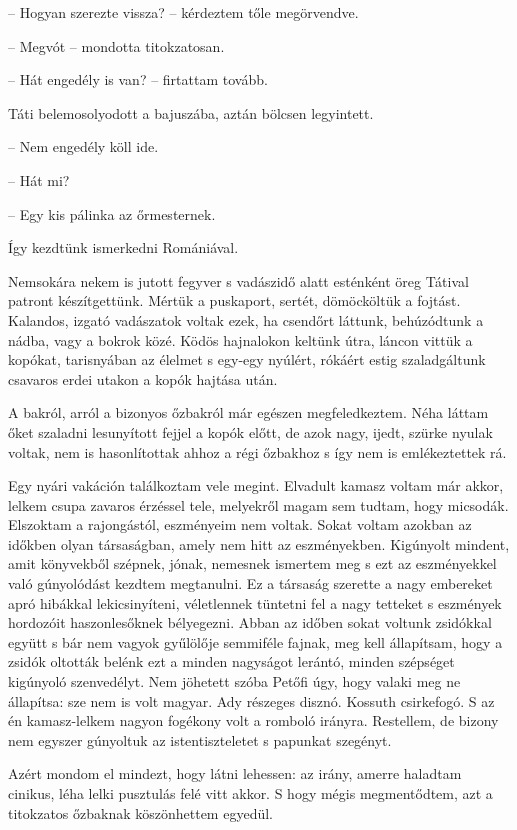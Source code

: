 \documentclass{IEEEtran}
\begin{document}
– Hogyan szerezte vissza? – kérdeztem tőle megörvendve.

– Megvót – mondotta titokzatosan.

– Hát engedély is van? – firtattam tovább.

Táti belemosolyodott a bajuszába, aztán bölcsen legyintett.

– Nem engedély köll ide.

– Hát mi?

– Egy kis pálinka az őrmesternek.

Így kezdtünk ismerkedni Romániával.

Nemsokára nekem is jutott fegyver s vadászidő alatt esténként öreg Tátival patront készítgettünk. Mértük a puskaport, sertét, dömöcköltük a fojtást. Kalandos, izgató vadászatok voltak ezek, ha csendőrt láttunk, behúzódtunk a nádba, vagy a bokrok közé. Ködös hajnalokon keltünk útra, láncon vittük a kopókat, tarisnyában az élelmet s egy-egy nyúlért, rókáért estig szaladgáltunk csavaros erdei utakon a kopók hajtása után.

A bakról, arról a bizonyos őzbakról már egészen megfeledkeztem. Néha láttam őket szaladni lesunyított fejjel a kopók előtt, de azok nagy, ijedt, szürke nyulak voltak, nem is hasonlítottak ahhoz a régi őzbakhoz s így nem is emlékeztettek rá.

Egy nyári vakáción találkoztam vele megint. Elvadult kamasz voltam már akkor, lelkem csupa zavaros érzéssel tele, melyekről magam sem tudtam, hogy micsodák. Elszoktam a rajongástól, eszményeim nem voltak. Sokat voltam azokban az időkben olyan társaságban, amely nem hitt az eszményekben. Kigúnyolt mindent, amit könyvekből szépnek, jónak, nemesnek ismertem meg s ezt az eszményekkel való gúnyolódást kezdtem megtanulni. Ez a társaság szerette a nagy embereket apró hibákkal lekicsinyíteni, véletlennek tüntetni fel a nagy tetteket s eszmények hordozóit haszonlesőknek bélyegezni. Abban az időben sokat voltunk zsidókkal együtt s bár nem vagyok gyűlölője semmiféle fajnak, meg kell állapítsam, hogy a zsidók oltották belénk ezt a minden nagyságot lerántó, minden szépséget kigúnyoló szenvedélyt. Nem jöhetett szóba Petőfi úgy, hogy valaki meg ne állapítsa: sze nem is volt magyar. Ady részeges disznó. Kossuth csirkefogó. S az én kamasz-lelkem nagyon fogékony volt a romboló irányra. Restellem, de bizony nem egyszer gúnyoltuk az istentiszteletet s papunkat szegényt.

Azért mondom el mindezt, hogy látni lehessen: az irány, amerre haladtam cinikus, léha lelki pusztulás felé vitt akkor. S hogy mégis megmentődtem, azt a titokzatos őzbaknak köszönhettem egyedül.
\end{document}
